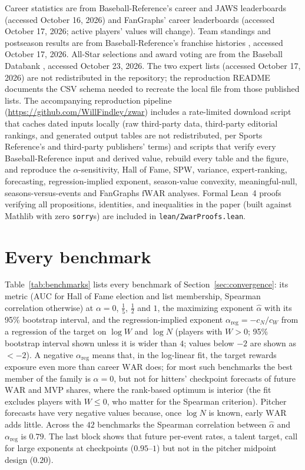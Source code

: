 \documentclass[11pt,letterpaper]{article}
\theoremstyle{plain}
\theoremstyle{definition}
\theoremstyle{remark}
\newcommand{\WAR}{\mathrm{WAR}}
\begin{document}
Career statistics are from Baseball-Reference's career and JAWS leaderboards \cite{bbref2026} (accessed October 16, 2026) and FanGraphs' career leaderboards \cite{fangraphs2026} (accessed October 17, 2026; active players' values will change). Team standings and postseason results are from Baseball-Reference's franchise histories \cite{bbrefteams}, accessed October 17, 2026. All-Star selections and award voting are from the Baseball Databank \cite{lahman}, accessed October 23, 2026. The two expert lists \cite{tsn1998,espn2022} (accessed October 17, 2026) are not redistributed in the repository; the reproduction README documents the CSV schema needed to recreate the local file from those published lists. The accompanying reproduction pipeline (\url{https://github.com/WillFindley/zwar}) includes a rate-limited download script that caches dated inputs locally (raw third-party data, third-party editorial rankings, and generated output tables are not redistributed, per Sports Reference's and third-party publishers' terms) and scripts that verify every Baseball-Reference input and derived value, rebuild every table and the figure, and reproduce the $\alpha$-sensitivity, Hall of Fame, SPW, variance, expert-ranking, forecasting, regression-implied exponent, season-value convexity, meaningful-null, seasons-versus-events and FanGraphs $\mathrm{fWAR}$ analyses. Formal Lean~4 proofs verifying all propositions, identities, and inequalities in the paper (built against Mathlib with zero \texttt{sorry}s) are included in \texttt{lean/ZwarProofs.lean}.

\appendix

\section{Every benchmark}
\label{app:benchmarks}

Table~\ref{tab:benchmarks} lists every benchmark of Section~\ref{sec:convergence}: its metric (AUC for Hall of Fame election and list membership, Spearman correlation otherwise) at $\alpha = 0$, $\tfrac15$, $\tfrac12$ and $1$, the maximizing exponent $\hat\alpha$ with its 95\% bootstrap interval, and the regression-implied exponent $\alpha_{\mathrm{reg}} = -c_N/c_W$ from a regression of the target on $\log W$ and $\log N$ (players with $W > 0$; 95\% bootstrap interval shown unless it is wider than $4$; values below $-2$ are shown as $<-2$). A negative $\alpha_{\mathrm{reg}}$ means that, in the log-linear fit, the target rewards exposure even more than career $\WAR$ does; for most such benchmarks the best member of the family is $\alpha = 0$, but not for hitters' checkpoint forecasts of future $\WAR$ and MVP shares, where the rank-based optimum is interior (the fit excludes players with $W \le 0$, who matter for the Spearman criterion). Pitcher forecasts have very negative values because, once $\log N$ is known, early $\WAR$ adds little. Across the $42$ benchmarks the Spearman correlation between $\hat\alpha$ and $\alpha_{\mathrm{reg}}$ is $0.79$. The last block shows that future per-event rates, a talent target, call for large exponents at checkpoints ($0.95$--$1$) but not in the pitcher midpoint design ($0.20$).
\end{document}
